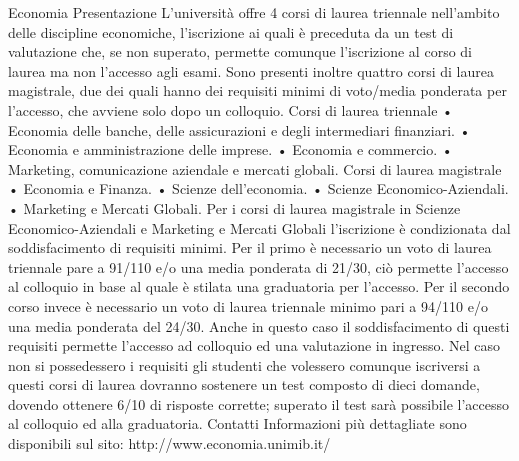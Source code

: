 Economia 
Presentazione
L'università offre 4 corsi di laurea triennale nell'ambito delle discipline economiche, l'iscrizione ai quali è preceduta da un test di valutazione che, se non superato, permette comunque l'iscrizione al corso di laurea ma non l'accesso agli esami. Sono presenti inoltre quattro corsi di laurea magistrale, due dei quali hanno dei requisiti minimi di voto/media ponderata per l'accesso, che avviene solo dopo un colloquio.
Corsi di laurea triennale
     • Economia delle banche, delle assicurazioni e degli intermediari finanziari. 
     • Economia e amministrazione delle imprese. 
     • Economia e commercio. 
     • Marketing, comunicazione aziendale e mercati globali. 
Corsi di laurea magistrale
     • Economia e Finanza. 
     • Scienze dell'economia. 
     • Scienze Economico-Aziendali. 
     • Marketing e Mercati Globali. 
Per i corsi di laurea magistrale in Scienze Economico-Aziendali e Marketing e Mercati Globali l'iscrizione è condizionata dal soddisfacimento di requisiti minimi. Per il primo è necessario un voto di laurea triennale pare a 91/110 e/o una media ponderata di 21/30, ciò permette l'accesso al colloquio in base al quale è stilata una graduatoria per l'accesso. Per il secondo corso invece è necessario un voto di laurea triennale minimo pari a 94/110 e/o una media ponderata del 24/30. Anche in questo caso il soddisfacimento di questi requisiti permette l'accesso ad colloquio ed una valutazione in ingresso. Nel caso non si possedessero i requisiti gli studenti che volessero comunque iscriversi a questi corsi di laurea dovranno sostenere un test composto di dieci domande, dovendo ottenere 6/10 di risposte corrette; superato il test sarà possibile l'accesso al colloquio ed alla graduatoria. 
Contatti
Informazioni più dettagliate sono disponibili sul sito: http://www.economia.unimib.it/ 
